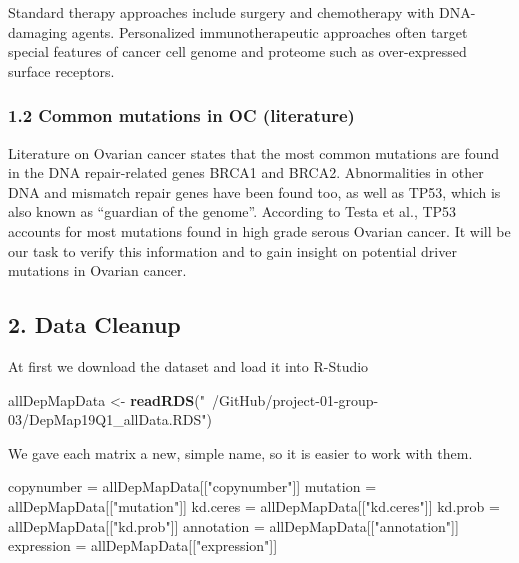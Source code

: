 \documentclass[]{article}
\newenvironment{Shaded}{\begin{snugshade}}{\end{snugshade}}
\newcommand{\KeywordTok}[1]{\textcolor[rgb]{0.13,0.29,0.53}{\textbf{#1}}}
\newcommand{\NormalTok}[1]{#1}
\newcommand{\StringTok}[1]{\textcolor[rgb]{0.31,0.60,0.02}{#1}}
\begin{document}
Standard therapy approaches include surgery and chemotherapy with
DNA-damaging agents. Personalized immunotherapeutic approaches often
target special features of cancer cell genome and proteome such as
over-expressed surface receptors.

\hypertarget{common-mutations-in-oc-literature}{%
\subsubsection{1.2 Common mutations in OC
(literature)}\label{common-mutations-in-oc-literature}}

Literature on Ovarian cancer states that the most common mutations are
found in the DNA repair-related genes BRCA1 and BRCA2. Abnormalities in
other DNA and mismatch repair genes have been found too, as well as
TP53, which is also known as ``guardian of the genome''. According to
Testa et al., TP53 accounts for most mutations found in high grade
serous Ovarian cancer. It will be our task to verify this information
and to gain insight on potential driver mutations in Ovarian cancer.

\hypertarget{data-cleanup}{%
\subsection{2. Data Cleanup}\label{data-cleanup}}

At first we download the dataset and load it into R-Studio

\begin{Shaded}
\begin{Highlighting}[]
\NormalTok{allDepMapData <-}\StringTok{ }\KeywordTok{readRDS}\NormalTok{(}\StringTok{"~/GitHub/project-01-group-03/DepMap19Q1_allData.RDS"}\NormalTok{)}
\end{Highlighting}
\end{Shaded}

We gave each matrix a new, simple name, so it is easier to work with
them.

\begin{Shaded}
\begin{Highlighting}[]
\NormalTok{copynumber =}\StringTok{ }\NormalTok{allDepMapData[[}\StringTok{"copynumber"}\NormalTok{]]}
\NormalTok{mutation =}\StringTok{ }\NormalTok{allDepMapData[[}\StringTok{"mutation"}\NormalTok{]]}
\NormalTok{kd.ceres =}\StringTok{ }\NormalTok{allDepMapData[[}\StringTok{"kd.ceres"}\NormalTok{]]}
\NormalTok{kd.prob =}\StringTok{ }\NormalTok{allDepMapData[[}\StringTok{"kd.prob"}\NormalTok{]]}
\NormalTok{annotation =}\StringTok{ }\NormalTok{allDepMapData[[}\StringTok{"annotation"}\NormalTok{]]}
\NormalTok{expression =}\StringTok{ }\NormalTok{allDepMapData[[}\StringTok{"expression"}\NormalTok{]]}
\end{Highlighting}
\end{Shaded}
\end{document}
